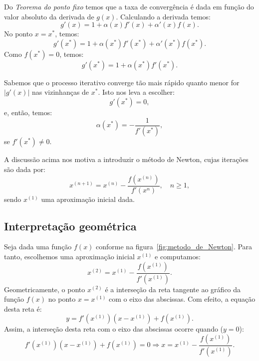 Do \emph{Teorema do ponto fixo} temos que a taxa de convergência é dada em função do valor absoluto da derivada de $g(x)$. Calculando a derivada temos:
\begin{equation*}
  g'(x)=1+\alpha(x)f'(x)+\alpha'(x)f(x).
\end{equation*}
No ponto $x = x^*$, temos:
\begin{equation*}
  g'(x^*) = 1 + \alpha(x^*)f'(x^*) + \alpha'(x^*)f(x^*).
\end{equation*}
Como $f(x^*)=0$, temos:
\begin{equation*}
  g'(x^*) = 1 + \alpha(x^*)f'(x^*).
\end{equation*}

Sabemos que o processo iterativo converge tão mais rápido quanto menor for $|g'(x)|$ nas vizinhanças de $x^*$. Isto nos leva a escolher:
\begin{equation*}
  g'(x^*) = 0,
\end{equation*}
e, então, temos:
\begin{equation*}
  \alpha(x^*) = -\frac{1}{f'(x^*)},
\end{equation*}
se $f'(x^*)\neq 0$.

A discussão acima nos motiva a introduzir o método de Newton, cujas iterações são dada por:
\begin{equation*}
  x^{(n+1)} = x^{(n)} - \frac{f\left(x^{(n)}\right)}{f'\left(x^{n}\right)}, \quad n\geq 1,
\end{equation*}
sendo $x^{(1)}$ uma aproximação inicial dada.

\subsection{Interpretação geométrica}

Seja dada uma função $f(x)$ conforme na figura~\ref{fig:metodo_de_Newton}. Para tanto, escolhemos uma aproximação inicial $x^{(1)}$ e computamos:
\begin{equation*}
  x^{(2)} = x^{(1)} - \frac{f(x^{(1)})}{f'(x^{(1)})}.
\end{equation*}
Geometricamente, o ponto $x^{(2)}$ é a interseção da reta tangente ao gráfico da função $f(x)$ no ponto $x = x^{(1)}$ com o eixo das abscissas. Com efeito, a equação desta reta é:
\begin{equation*}
  y = f'(x^{(1)})(x - x^{(1)}) + f(x^{(1)}).
\end{equation*}
Assim, a interseção desta reta com o eixo das abscissas ocorre quando ($y=0$):
\begin{equation*}
  f'(x^{(1)})(x - x^{(1)}) + f(x^{(1)}) = 0\Rightarrow x = x^{(1)} - \frac{f(x^{(1)})}{f'(x^{(1)})}.
\end{equation*}

